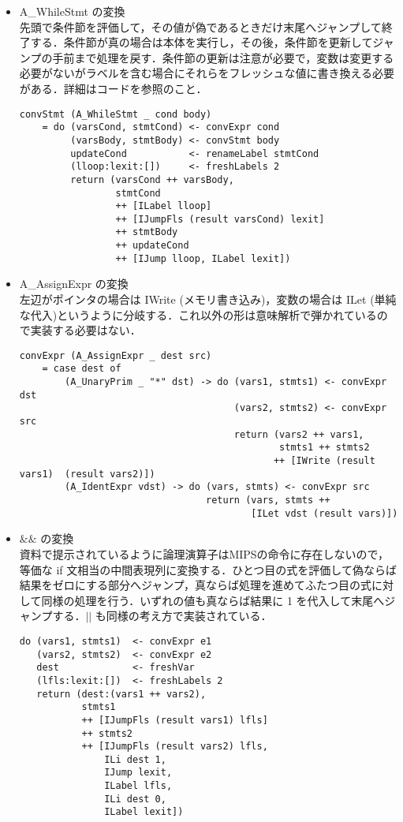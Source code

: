 \documentclass{jsarticle}
\begin{document}
\begin{itemize}
\item A\_WhileStmt の変換 \mbox{} \\
先頭で条件節を評価して，その値が偽であるときだけ末尾へジャンプして終了する．条件節が真の場合は本体を実行し，その後，条件節を更新してジャンプの手前まで処理を戻す．条件節の更新は注意が必要で，変数は変更する必要がないがラベルを含む場合にそれらをフレッシュな値に書き換える必要がある．詳細はコードを参照のこと．
\begin{verbatim}
convStmt (A_WhileStmt _ cond body)
    = do (varsCond, stmtCond) <- convExpr cond
         (varsBody, stmtBody) <- convStmt body
         updateCond           <- renameLabel stmtCond
         (lloop:lexit:[])     <- freshLabels 2
         return (varsCond ++ varsBody,
                 stmtCond
                 ++ [ILabel lloop]
                 ++ [IJumpFls (result varsCond) lexit]
                 ++ stmtBody
                 ++ updateCond
                 ++ [IJump lloop, ILabel lexit])
\end{verbatim}
\item A\_AssignExpr の変換 \mbox{} \\
左辺がポインタの場合は IWrite (メモリ書き込み)，変数の場合は ILet (単純な代入)というように分岐する．これ以外の形は意味解析で弾かれているので実装する必要はない．
\begin{verbatim}
convExpr (A_AssignExpr _ dest src)
    = case dest of
        (A_UnaryPrim _ "*" dst) -> do (vars1, stmts1) <- convExpr dst
                                      (vars2, stmts2) <- convExpr src
                                      return (vars2 ++ vars1,
                                              stmts1 ++ stmts2
                                             ++ [IWrite (result vars1)  (result vars2)])
        (A_IdentExpr vdst) -> do (vars, stmts) <- convExpr src
                                 return (vars, stmts ++
                                         [ILet vdst (result vars)])
\end{verbatim}

\item $\&\&$ の変換 \mbox{} \\
資料で提示されているように論理演算子はMIPSの命令に存在しないので，等価な if 文相当の中間表現列に変換する．ひとつ目の式を評価して偽ならば結果をゼロにする部分へジャンプ，真ならば処理を進めてふたつ目の式に対して同様の処理を行う．いずれの値も真ならば結果に 1 を代入して末尾へジャンプする．$||$ も同様の考え方で実装されている．
\begin{verbatim}
do (vars1, stmts1)  <- convExpr e1
   (vars2, stmts2)  <- convExpr e2
   dest             <- freshVar
   (lfls:lexit:[])  <- freshLabels 2
   return (dest:(vars1 ++ vars2),
           stmts1
           ++ [IJumpFls (result vars1) lfls]
           ++ stmts2
           ++ [IJumpFls (result vars2) lfls,
               ILi dest 1,
               IJump lexit,
               ILabel lfls,
               ILi dest 0,
               ILabel lexit])
\end{verbatim}
\end{itemize}
\end{document}
